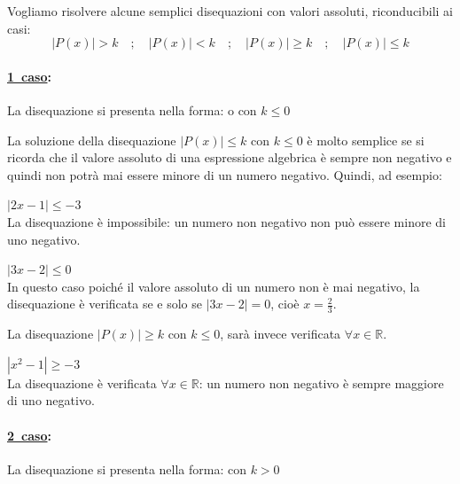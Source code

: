 Vogliamo risolvere alcune semplici disequazioni con valori assoluti, 
riconducibili ai casi:
$$|P(x)|>k \quad; \quad |P(x)|<k\quad; \quad |P(x)|\geq k\quad; \quad |P(x)|\leq k$$


\paragraph{\underline{1\textdegree~caso}:} La disequazione si presenta nella forma:  
 o  con $k\leq 0$

\vspace{4pt}

La soluzione della disequazione $|P(x)|\leq k$ con $k\leq 0$ è molto semplice 
se si ricorda che il valore assoluto di una espressione algebrica è sempre non 
negativo e quindi non potrà mai essere minore di un numero negativo. Quindi, ad esempio:

\begin{esempio}  
$|2x-1|\leq -3$ \\[4pt] La disequazione è impossibile: un numero non negativo non può essere minore di uno negativo.
\end{esempio}
\begin{esempio} $|3x-2|\leq 0$ \\[4pt] In questo caso poiché il 
valore assoluto di un numero non è mai negativo, la disequazione è verificata 
se e solo se $|3x-2|=0$, cioè $x=\frac{2}{3}$.
\end{esempio}

La disequazione $|P(x)|\geq k$ con $k\leq 0$, sarà invece verificata $\forall x 
\in \mathbb{R}$.

\begin{esempio} $|x^2-1|\geq -3$\\[4pt] La disequazione è 
verificata $\forall x \in \mathbb{R}$: un numero non negativo è sempre maggiore di uno negativo.
\end{esempio}

\paragraph{\underline{2\textdegree~caso}:} La disequazione si presenta nella forma:  
 con $k> 0$

